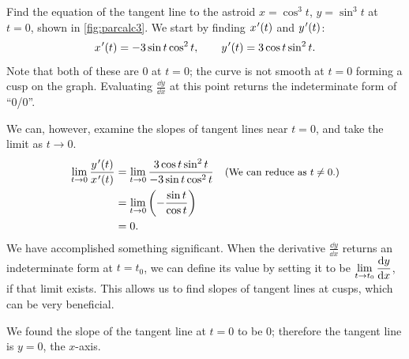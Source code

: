 \begin{example}\label{ex_parcalc3}%
Find the equation of the tangent line to the astroid $x=\cos^3 t$, $y=\sin^3t$ at $t=0$, shown in \autoref{fig:parcalc3}.
\solution
We start by finding $x\primeskip'(t)$ and $y\primeskip'(t)$:
%
%
\[x\primeskip'(t) = -3\sin t\cos^2t, \qquad y\primeskip'(t) = 3\cos t\sin^2t.\]
Note that both of these are 0 at $t=0$; the curve is not smooth at $t=0$ forming a cusp on the graph. Evaluating $\frac{\dd y}{\dd x}$ at this point returns the indeterminate form of ``0/0''. 

We can, however, examine the slopes of tangent lines near $t=0$, and take the limit as $t\to 0$. 
\begin{align*}
	\lim_{t\to0} \frac{y\primeskip'(t)}{x\primeskip'(t)}
	&=\lim_{t\to0} \frac{3\cos t\sin^2t}{-3\sin t\cos^2t}
	\quad \text{\small (We can reduce as $t\neq 0$.)}\\
	&= \lim_{t\to0}\left(-\frac{\sin t}{\cos t}\right)\\
	&= 0.
\end{align*}
We have accomplished something significant. When the derivative $\frac{\dd y}{\dd x}$ returns an indeterminate form at $t=t_0$, we can define its value by setting it to be $\displaystyle \lim_{t\to t_0}\frac{\operatorname{d}\! y}{\operatorname{d}\! x}$, if that limit exists. This allows us to find slopes of tangent lines at cusps, which can be very beneficial. 

We found the slope of the tangent line at $t=0$ to be 0; therefore the tangent line is $y=0$, the $x$-axis.
\end{example}

